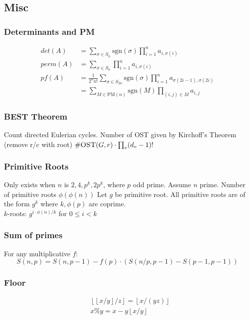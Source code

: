   \subsection{Misc}
    \subsubsection{Determinants and PM}
      \begin{align*}
        det(A) &= \sum_{\sigma \in S_n}\text{sgn}(\sigma)\prod_{i = 1}^n a_{i,\sigma(i)}\\
        perm(A) &= \sum_{\sigma \in S_n} \prod_{i = 1}^n a_{i,\sigma(i)}\\
        pf(A) &= \frac{1}{2^nn!}\sum_{\sigma \in S_{2n}} \text{sgn}(\sigma)\prod_{i = 1}^n a_{\sigma(2i-1),\sigma(2i)}\\ &= \sum_{M \in \text{PM}(n)} \text{sgn}(M) \prod_{(i,j) \in M} a_{i,j}
      \end{align*}

    \subsubsection{BEST Theorem}
      Count directed Eulerian cycles. Number of OST given by
      Kirchoff's Theorem (remove r/c with root) $\#\textsc{OST}(G,r)
      \cdot \prod_{v}(d_v-1)!$

    \subsubsection{Primitive Roots}
      Only exists when $n$ is $2, 4, p^k, 2p^k$, where $p$ odd prime. Assume
      $n$ prime. Number of primitive roots $\phi(\phi(n))$
      Let $g$ be primitive root. All primitive roots are of the form $g^k$
      where $k,\phi(p)$ are coprime.\\ $k$-roots:
      $g^{i \cdot \phi(n) / k}$ for $0 \leq i < k$

    \subsubsection{Sum of primes} For any multiplicative $f$:
      \[
          S(n,p) = S(n, p-1) - f(p) \cdot (S(n/p,p-1) - S(p-1,p-1))
      \]

    \subsubsection{Floor}
      \begin{align*}
          &\left\lfloor \left\lfloor x/y \right\rfloor / z \right\rfloor = \left\lfloor x / (yz) \right\rfloor \\
          &x \% y = x - y \left\lfloor x / y \right\rfloor
      \end{align*}
